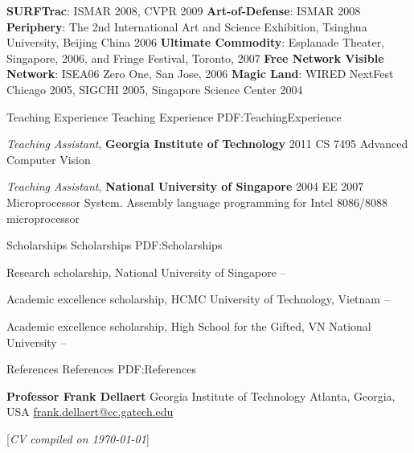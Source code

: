 \documentclass[letterpaper,MMMyyyy,nonstopmode]{simpleresumecv}
\newcommand{\CVNote}{CV compiled on {\today}}
\begin{document}
\begin{Body}
\BulletItem
\textbf{SURFTrac}: ISMAR 2008, CVPR 2009
\BulletItem
\textbf{Art-of-Defense}: ISMAR 2008
\BulletItem
\textbf{Periphery}: The 2nd International Art and Science Exhibition, Tsinghua University, Beijing China 2006
\BulletItem
\textbf{Ultimate Commodity}: Esplanade Theater, Singapore, 2006, and Fringe Festival, Toronto, 2007
\BulletItem
\textbf{Free Network Visible Network}: ISEA06 Zero One, San Jose, 2006
\BulletItem
\textbf{Magic Land}: WIRED NextFest Chicago 2005, SIGCHI 2005, Singapore Science Center 2004


\Section
{Teaching Experience}
{Teaching Experience}
{PDF:TeachingExperience}

\Entry
{\textit{Teaching Assistant}, \textbf{Georgia Institute of Technology}}
\hfill
2011
\Gap
\BulletItem
CS 7495 Advanced Computer Vision

\BigGap
\Entry
{\textit{Teaching Assistant}, \textbf{National University of Singapore}}
\hfill
2004
\Gap
\BulletItem
EE 2007 Microprocessor System. Assembly language programming for Intel 8086/8088 microprocessor



\Section
{Scholarships}
{Scholarships}
{PDF:Scholarships}

\BulletItem
Research scholarship, National University of Singapore
\hfill
{} --

\Gap
\BulletItem
Academic excellence scholarship, HCMC University of Technology, Vietnam
\hfill
{} --

\Gap
\BulletItem
Academic excellence scholarship, High School for the Gifted, VN National University
\hfill
{} --


\endgroup


\Section
{References}
{References}
{PDF:References}

\BulletItem
\textbf{Professor Frank Dellaert}
\newline
Georgia Institute of Technology
\newline
Atlanta, Georgia, USA
\newline
\href{mailto:frank.dellaert@cc.gatech.edu}
{frank.dellaert@cc.gatech.edu}

\end{Body}


\UseNoteFont%
\null\hfill%
[\textit{\CVNote}]
\end{document}
